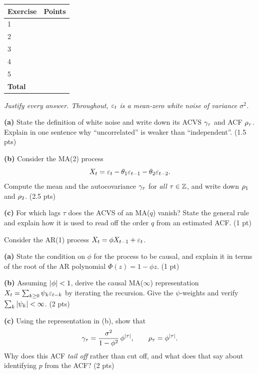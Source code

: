 \documentclass[11pt]{article}
\begin{document}
\begin{center}
\renewcommand{\arraystretch}{1.5}
\begin{tabular}{|p{5cm}|p{4cm}|}
  \hline
  \textbf{Exercise} & \textbf{Points}\\\hline
  1 & \\\hline
  2 & \\\hline
  3 & \\\hline
  4 & \\\hline
  5 & \\\hline
  \textbf{Total} & \\\hline
\end{tabular}
\end{center}
\begin{center}\itshape Justify every answer. Throughout, $\varepsilon_t$ is a mean-zero white noise of variance $\sigma^2$.\end{center}

\textbf{(a)} State the definition of white noise and write down its ACVS $\gamma_\tau$ and ACF $\rho_\tau$. Explain in one sentence why ``uncorrelated'' is weaker than ``independent''. \hfill(1.5 pts)

\textbf{(b)} Consider the MA(2) process
\[
X_t=\varepsilon_t-\theta_1\varepsilon_{t-1}-\theta_2\varepsilon_{t-2}.
\]
Compute the mean and the autocovariance $\gamma_\tau$ for \emph{all} $\tau\in\mathbb{Z}$, and write down $\rho_1$ and $\rho_2$. \hfill(2.5 pts)

\textbf{(c)} For which lags $\tau$ does the ACVS of an MA($q$) vanish? State the general rule and explain how it is used to read off the order $q$ from an estimated ACF. \hfill(1 pt)
\answerpage

Consider the AR(1) process $X_t=\phi X_{t-1}+\varepsilon_t$.

\textbf{(a)} State the condition on $\phi$ for the process to be causal, and explain it in terms of the root of the AR polynomial $\Phi(z)=1-\phi z$. \hfill(1 pt)

\textbf{(b)} Assuming $\left\lvert \phi \right\rvert<1$, derive the causal MA($\infty$) representation $X_t=\sum_{k\ge0}\psi_k\varepsilon_{t-k}$ by iterating the recursion. Give the $\psi$-weights and verify $\sum_k\left\lvert \psi_k \right\rvert<\infty$. \hfill(2 pts)

\textbf{(c)} Using the representation in (b), show that
\[
\gamma_\tau=\frac{\sigma^2}{1-\phi^2}\,\phi^{\left\lvert \tau \right\rvert},
\qquad
\rho_\tau=\phi^{\left\lvert \tau \right\rvert}.
\]
Why does this ACF \emph{tail off} rather than cut off, and what does that say about identifying $p$ from the ACF? \hfill(2 pts)
\answerpage
\end{document}
